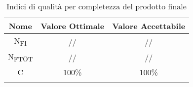 			\begin{center}
				\begin{longtable}{|c|c|c|}
				\hline
				\rowcolor{lighter-grayer}
				\textbf{Nome} & \textbf{Valore Ottimale} & \textbf{Valore Accettabile}\\
				\hline
				\endfirsthead
				\hline
				N\textsubscript{FI} & // & // \\
				\hline
				N\textsubscript{FTOT} & // & // \\
				\hline				\hline
				C & 100\% & 100\% \\
				\hline
				\caption{Indici di qualità per completezza del prodotto finale}
				\end{longtable}
			\end{center}
				
	
	
	
	
	
	
	
	
	
	
	
	
	
	
	
	